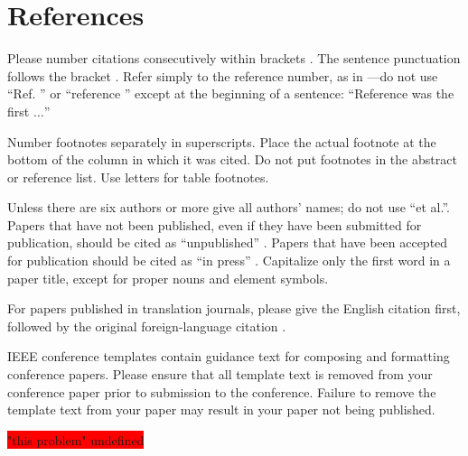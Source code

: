 \documentclass[conference]{IEEEtran}
\begin{document}
\section*{References}

Please number citations consecutively within brackets \cite{b1}. The 
sentence punctuation follows the bracket \cite{b2}. Refer simply to the reference 
number, as in \cite{b3}---do not use ``Ref. \cite{b3}'' or ``reference \cite{b3}'' except at 
the beginning of a sentence: ``Reference \cite{b3} was the first $\ldots$''

Number footnotes separately in superscripts. Place the actual footnote at 
the bottom of the column in which it was cited. Do not put footnotes in the 
abstract or reference list. Use letters for table footnotes.

Unless there are six authors or more give all authors' names; do not use 
``et al.''. Papers that have not been published, even if they have been 
submitted for publication, should be cited as ``unpublished'' \cite{b4}. Papers 
that have been accepted for publication should be cited as ``in press'' \cite{b5}. 
Capitalize only the first word in a paper title, except for proper nouns and 
element symbols.

For papers published in translation journals, please give the English 
citation first, followed by the original foreign-language citation \cite{b6}.

\begin{thebibliography}{00}


\end{thebibliography}
\vspace{12pt}
\color{red}
IEEE conference templates contain guidance text for composing and formatting conference papers. Please ensure that all template text is removed from your conference paper prior to submission to the conference. Failure to remove the template text from your paper may result in your paper not being published.

\colorbox{red}{"this problem" undefined}
\end{document}
